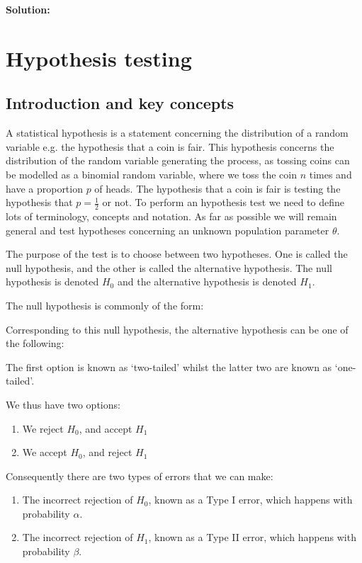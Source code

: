 \documentclass[12pt]{article}
\begin{document}
\begin{mdframed}
{\bf Solution:}
\textcolor[rgb]{1.00,1.00,1.00}{\lipsum[1-3]}
\end{mdframed}

\newpage
\section{Hypothesis testing}
\subsection{Introduction and key concepts}
A statistical hypothesis is a statement concerning the distribution of a random variable e.g. the hypothesis that a coin is fair. This hypothesis concerns the distribution of the random variable generating the process, as tossing coins can be modelled as a binomial random variable, where we toss the coin $n$ times and have a proportion $p$ of heads. The hypothesis that a coin is fair is testing the hypothesis that $p=\frac{1}{2}$ or not. To perform an hypothesis test we need to define lots of terminology, concepts and notation. As far as possible we will remain general and test hypotheses concerning an unknown population parameter $\theta.$

The purpose of the test is to choose between two hypotheses. One is called the null hypothesis, and the other is called the alternative hypothesis.
The null hypothesis is denoted $H_0$ and the alternative hypothesis is denoted $H_1$.

The null hypothesis is commonly of the form:
\begin{mdframed}
\textcolor[rgb]{1.00,1.00,1.00}{\lipsum[1]}
\end{mdframed}

Corresponding to this null hypothesis, the alternative hypothesis can be one of the following:
\begin{mdframed}
\textcolor[rgb]{1.00,1.00,1.00}{\lipsum[1]}
The first option is known as `two-tailed' whilst the latter two are known as `one-tailed'.
\end{mdframed}

We thus have two options:
\begin{enumerate}
\item We reject $H_{0}$, and accept $H_{1}$
\item We accept $H_{0}$, and reject $H_{1}$
\end{enumerate}

Consequently there are two types of errors that we can make:
\begin{enumerate}
\item The incorrect rejection of $H_{0}$, known as a Type I error, which happens with probability $\alpha$.
\item The incorrect rejection of $H_{1}$, known as a Type II error, which happens with probability $\beta$.
\end{enumerate}
\end{document}
